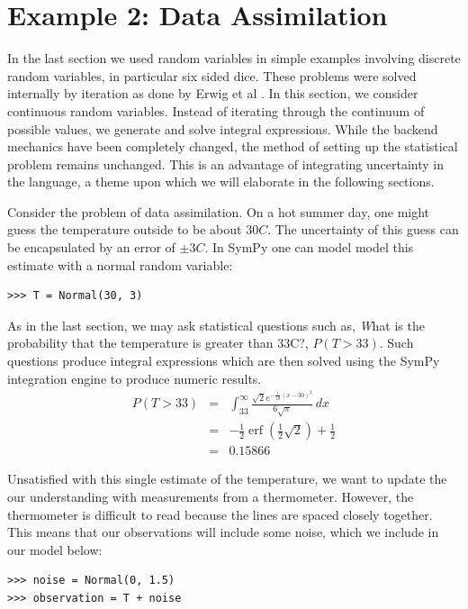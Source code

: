 \section{Example 2: Data Assimilation}

In the last section we used random variables in simple examples involving
discrete random variables, in particular six sided dice. These problems were
solved internally by iteration as done by Erwig et al \cite{Erwig2006}. In this
section, we consider continuous random variables. Instead of iterating through
the continuum of possible values, we generate and solve integral expressions.
 While the backend mechanics have been completely changed, the
method of setting up the statistical problem remains unchanged. This is an
advantage of integrating uncertainty in the language, a theme upon which we
will elaborate in the following sections.

Consider the problem of data assimilation. On a hot summer day, one might guess
the temperature outside to be about $30C$. The uncertainty of this guess can be
encapsulated by an error of $\pm3C$. In SymPy one can model model this estimate
with a normal random variable:

\begin{lstlisting}
>>> T = Normal(30, 3)
\end{lstlisting}

As in the last section, we may ask statistical questions such as, {\emph What is the
probability that the temperature is greater than 33C?}, $P(T>33)$. Such
questions produce integral expressions which are then solved using the SymPy
integration engine to produce numeric results.
\begin{eqnarray*}
P(T>33) & = & \int_{33}^{\infty} \frac{\sqrt{2} e^{- \frac{1}{18} \left(x -30\right)^{2}}}{6 \sqrt{\pi}}\, dx \\
& = & - \frac{1}{2} \operatorname{erf}{\left (\frac{1}{2} \sqrt{2} \right )} + \frac{1}{2} \\
& = & 0.15866
\end{eqnarray*}

Unsatisfied with this single estimate of the temperature, we want to update the
our understanding with measurements from a thermometer. However, the thermometer is difficult to read because the lines are spaced closely
together.  This means that our observations will include some noise, which we
include in our model below:

\begin{lstlisting}
>>> noise = Normal(0, 1.5)
>>> observation = T + noise
\end{lstlisting}

